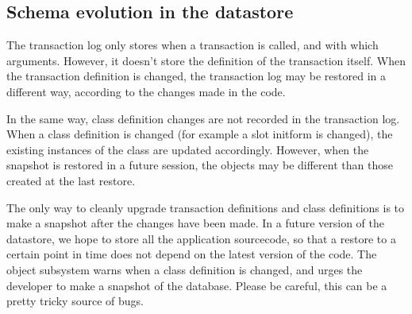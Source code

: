 \subsection{ Schema evolution in the datastore}
The transaction log only stores when a transaction is called, and
with which arguments. However, it doesn't store the definition of
the transaction itself. When the transaction definition is
changed, the transaction log may be restored in a different way,
according to the changes made in the code.

In the same way, class definition changes are not recorded in the
transaction log. When a class definition is changed (for example a
slot initform is changed), the existing instances of the class are
updated accordingly. However, when the snapshot is restored in a
future session, the objects may be different than those created at
the last restore.

The only way to cleanly upgrade transaction definitions and class
definitions is to make a snapshot after the changes have been
made. In a future version of the datastore, we hope to store all
the application sourcecode, so that a restore to a certain point
in time does not depend on the latest version of the code. The
object subsystem warns when a class definition is changed, and
urges the developer to make a snapshot of the database. Please be
careful, this can be a pretty tricky source of bugs.
